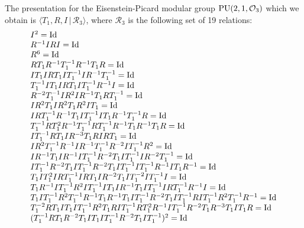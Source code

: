 \documentclass{article}[12pt]
\newcommand{\la}{\langle}
\newcommand{\ra}{\rangle}
\begin{document}
The presentation for the Eisenstein-Picard modular group ${\rm PU}(2,1,\mathcal{O}_3)$ which we obtain is $\la T_1, R, I \, | \, \mathcal{R}_3 \ra$, where $\mathcal{R}_3$ is the following set of 19 relations:
$$\begin{array}{l}
I^2 = {\rm Id} \\
    R^{-1}  I  R  I = {\rm Id} \\
    R^6 = {\rm Id} \\
    R  T_1  R^{-1}  T_1^{-1}  R^{-1}  T_1  R = {\rm Id} \\
    I  T_1  I  R  T_1  I  T_1^{-1}  I  R^{-1}  T_1^{-1} = {\rm Id} \\
    T_1^{-1}  I  T_1  I  R  T_1  I  T_1^{-1}  R^{-1}  I = {\rm Id} \\
    R^{-2}  T_1^{-1}  I  R^2  I  R^{-1}  T_1  R  T_1^{-1} = {\rm Id} \\
    I  R^2  T_1  I  R^2  T_1  R^2  I  T_1 = {\rm Id} \\
    I  R  T_1^{-1}  R^{-1}  T_1  I  T_1^{-1}  I  T_1  R^{-1} 
    T_1^{-1}  R = {\rm Id} \\
    T_1^{-1}  R  T_1^2  R^{-1}  T_1^{-1}  R  T_1^{-1}  R^{-1}  T_1 
    R^{-1}  T_1  R = {\rm Id} \\
    I  T_1^{-1}  R  T_1  I  R^{-3}  T_1  R  I  R  T_1 =
    {\rm Id} \\
    I  R^2  T_1^{-1}  R^{-1}  I  R^{-1}  T_1^{-1}  R^{-2}  I 
    T_1^{-1}  R^2 = {\rm Id} \\
    I  R^{-1}  T_1  I  R^{-1}  I  T_1^{-1}  R^{-2}  T_1  I 
    T_1^{-1}  I  R^{-2}  T_1^{-1} = {\rm Id} \\
    I  T_1^{-1}  R^{-2}  T_1  I  T_1^{-1}  R^{-2}  T_1  I  T_1^{-1} 
    I  T_1^{-1}  R^{-1}  I  T_1  R^{-1} = {\rm Id} \\
    T_1  I  T_1^2  I  R  T_1^{-1}  I  R  T_1  I  R^{-2} 
    T_1  I  T_1^{-2}  I  T_1^{-1}  I = {\rm Id} \\
    T_1  R^{-1}  I  T_1^{-1}  R^2  I  T_1^{-1}  I  T_1  I 
    R^{-1}  T_1  I  T_1^{-1}  I  R  T_1^{-1}  R^{-1}  I = {\rm Id} \\
    T_1  I  T_1^{-1}  R^2  T_1^{-1}  R^{-1}  T_1  R^{-1}  T_1  I 
    T_1^{-1}  R^{-2}  T_1  I  T_1^{-1}  R  I  T_1^{-1}  R^2  T_1^{-1} 
    R^{-1} = {\rm Id} \\
    T_1^{-2}  R  T_1  I  T_1  I  T_1^{-1}  R^2  T_1  R  I 
    T_1^{-1}  R  T_1^2  R^{-1}  I  T_1^{-1}  R^{-2}  T_1  R^{-3}  T_1 
    I  T_1  R = {\rm Id} \\
    (T_1^{-1}  R  T_1  R^{-2}  T_1  I  T_1  I  T_1^{-1}  R^{-2}  T_1
     I T_1^{-1})^2 = {\rm Id} 
\end{array}$$
\end{document}
